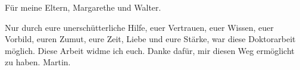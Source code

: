 \begin{flushright}
Für meine Eltern, Margarethe und Walter.
\vspace{5mm}

Nur durch eure unerschütterliche Hilfe, euer Vertrauen, euer Wissen, euer Vorbild, euren Zumut, eure Zeit, Liebe und eure Stärke, war diese Doktorarbeit möglich. Diese Arbeit widme ich euch. Danke dafür, mir diesen Weg ermöglicht zu haben. Martin.
\end{flushright}
